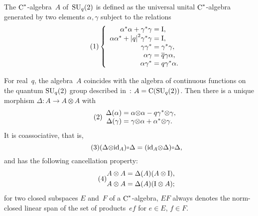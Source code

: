 \documentclass[a4paper]{amsart}
\numberwithin{equation}{section}
\theoremstyle{definition}
\theoremstyle{remark}
\begin{document}
The ${\textup{C}^*}${\nobreakdash}-algebra~${{A}}$ of~${\textup{SU}}_q(2)$ is defined as the
universal unital ${\textup{C}^*}${\nobreakdash}-algebra generated by two elements
$\alpha,\gamma$ subject to the relations
\[
{\label{{SU2q}}\stepcounter{equation}\tag{\theequation}}
\left\{
\begin{array}{r@{\;=\;}l}
\alpha^{*}\alpha+\gamma^{*}\gamma&{\textup{I}},\\
\alpha\alpha^{*}+{\left|{q}\right|}^{2}\gamma^{*}\gamma&{\textup{I}},\\
\gamma\gamma^{*}&\gamma^{*}\gamma,\\
\alpha\gamma&{\overline{q}}\gamma\alpha,\\
\alpha\gamma^{*}&q\gamma^{*}\alpha.
\end{array}
\right.
\]

For real~$q$, the algebra~\({{A}}\) coincides with the algebra of
continuous functions on the quantum ${\textup{SU}}_q(2)$ group described
in~\cite{Woronowicz:Twisted_SU2}: ${{A}} =\operatorname{C}({\textup{SU}}_{q}(2))$.  Then
there is a unique morphism $\Delta\colon {{A}}\to {{A}} {\otimes}
{{A}}$ with
\[
{\label{{Delta}}\stepcounter{equation}\tag{\theequation}}
\begin{array}{r@{\;=\;}l}
\Delta(\alpha)&\alpha{\otimes}\alpha-q\gamma^{*}{\otimes}\gamma,\\
\Delta(\gamma)&\gamma{\otimes}\alpha+\alpha^{*}{\otimes}\gamma.
\end{array}
\]
It is coassociative, that is,
\[
{\label{{coassociative}}\stepcounter{equation}\tag{\theequation}}
(\Delta{\otimes}{\textup{id}}_{{A}}){\mathbin{\mathchoice
{{\vcenter{\hbox{$\scriptstyle\circ$}}}}{{\vcenter{\hbox{$\scriptstyle\circ$}}}}
{{\vcenter{\hbox{$\scriptscriptstyle\circ$}}}}{{\vcenter{\hbox{$\scriptscriptstyle\circ$}}}}}}\Delta
= ({\textup{id}}_{{A}}{\otimes}\Delta){\mathbin{\mathchoice
{{\vcenter{\hbox{$\scriptstyle\circ$}}}}{{\vcenter{\hbox{$\scriptstyle\circ$}}}}
{{\vcenter{\hbox{$\scriptscriptstyle\circ$}}}}{{\vcenter{\hbox{$\scriptscriptstyle\circ$}}}}}}\Delta,
\]
and has the following cancellation property:
\[
{\label{{cancellation}}\stepcounter{equation}\tag{\theequation}}
\begin{aligned}
  A\otimes A &= \Delta(A)(A\otimes{\textup{I}}),\\
  A\otimes A &= \Delta(A)({\textup{I}}\otimes A);
\end{aligned}
\]
for two closed subspaces $E$ and~$F$ of a ${\textup{C}^*}${\nobreakdash}-algebra, $EF$
always denotes the norm-closed linear span of the set of products~$ef$
for $e\in E$, $f\in F$.
\end{document}
